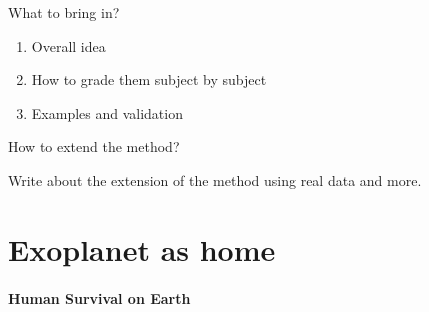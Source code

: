 \documentclass[%
 reprint,
 amsmath,amssymb,
 aps,
]{revtex4-1}
\begin{document}
What to bring in?

\begin{enumerate}
\item Overall idea
\item How to grade them subject by subject
\item Examples and validation
\end{enumerate}

How to extend the method?

Write about the extension of the method using real data and more.





\section{\label{sec:level1}Exoplanet as home}



\paragraph{Human Survival on Earth}
\end{document}
